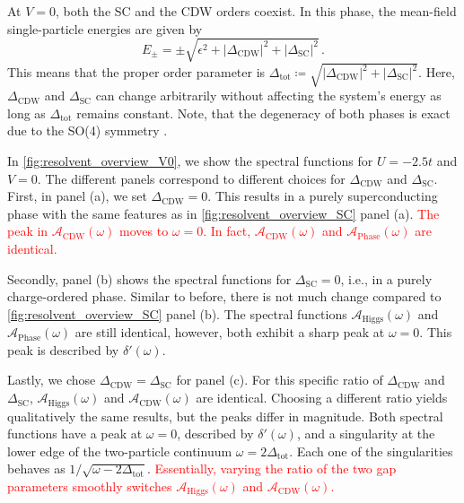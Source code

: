 \documentclass[
    reprint, 
    aps,
    preprintnumbers,
    twocolumn,
    prb,
    superscriptaddress
]{revtex4-2}
\newcommand{\spectral}[1]{\mathcal{A}_\text{#1}  (\omega)}
\begin{document}

At $V=0$, both the SC and the CDW orders coexist. 
In this phase, the mean-field single-particle energies are given by
\begin{equation}
    E_{\pm} = \pm \sqrt{\epsilon^2 + |\Delta_\text{CDW}|^2 + |\Delta_\text{SC}|^2}\,.
\end{equation}
This means that the proper order parameter is $\Delta_\text{tot} \coloneqq \sqrt{|\Delta_\text{CDW}|^2 + |\Delta_\text{SC}|^2}$.
Here, $\Delta_\text{CDW}$ and $\Delta_\text{SC}$ can change arbitrarily without affecting the system's energy as long as $\Delta_\text{tot}$ remains constant.
Note, that the degeneracy of both phases is exact due to the SO(4) symmetry \cite{yang90}. 

In \autoref{fig:resolvent_overview_V0}, we show the spectral functions for $U=-2.5t$ and $V=0$.
The different panels correspond to different choices for $\Delta_\text{CDW}$ and $\Delta_\text{SC}$.
First, in panel (a), we set $\Delta_\text{CDW} = 0$.
This results in a purely superconducting phase with the same features as in \autoref{fig:resolvent_overview_SC} panel (a).
\textcolor{red}{The peak in $\spectral{CDW}$ moves to $\omega=0$. In fact, $\spectral{CDW}$ and $\spectral{Phase}$ are identical.}

Secondly, panel (b) shows the spectral functions for $\Delta_\text{SC} = 0$, i.e., in a purely charge-ordered phase.
Similar to before, there is not much change compared to \autoref{fig:resolvent_overview_SC} panel (b).
The spectral functions $\spectral{Higgs}$ and $\spectral{Phase}$ are still identical, however, both exhibit a sharp peak at $\omega=0$.
This peak is described by $\delta'(\omega)$.

Lastly, we chose $\Delta_\text{CDW} = \Delta_\text{SC}$ for panel (c).
For this specific ratio of $\Delta_\text{CDW}$ and $\Delta_\text{SC}$, $\spectral{Higgs}$ and $\spectral{CDW}$ are identical.
Choosing a different ratio yields qualitatively the same results, but the peaks differ in magnitude.
Both spectral functions have a peak at $\omega = 0$, described by $\delta'(\omega)$, and a singularity at the lower edge of the two-particle continuum $\omega = 2\Delta_\text{tot}$.
Each one of the singularities behaves as $1/\sqrt{\omega - 2 \Delta_\text{tot}}$.
\textcolor{red}{Essentially, varying the ratio of the two gap parameters smoothly switches $\spectral{Higgs}$ and $\spectral{CDW}$.}
\end{document}
